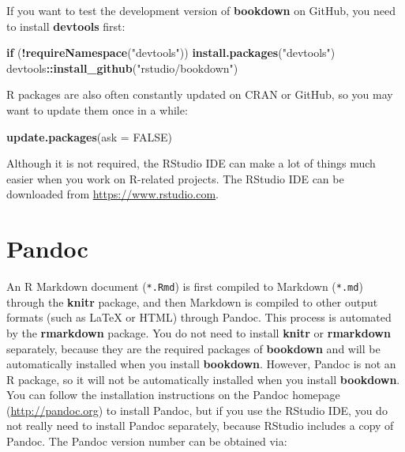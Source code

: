 \documentclass[
  12pt,
]{book}
\newenvironment{Shaded}{\begin{snugshade}}{\end{snugshade}}
\newcommand{\ControlFlowTok}[1]{\textcolor[rgb]{0.13,0.29,0.53}{\textbf{#1}}}
\newcommand{\DataTypeTok}[1]{\textcolor[rgb]{0.13,0.29,0.53}{#1}}
\newcommand{\KeywordTok}[1]{\textcolor[rgb]{0.13,0.29,0.53}{\textbf{#1}}}
\newcommand{\NormalTok}[1]{#1}
\newcommand{\OperatorTok}[1]{\textcolor[rgb]{0.81,0.36,0.00}{\textbf{#1}}}
\newcommand{\OtherTok}[1]{\textcolor[rgb]{0.56,0.35,0.01}{#1}}
\newcommand{\StringTok}[1]{\textcolor[rgb]{0.31,0.60,0.02}{#1}}
\begin{document}
If you want to test the development version of \textbf{bookdown} on GitHub, you need to install \textbf{devtools} first:

\begin{Shaded}
\begin{Highlighting}[]
\ControlFlowTok{if}\NormalTok{ (}\OperatorTok{!}\KeywordTok{requireNamespace}\NormalTok{(}\StringTok{"devtools"}\NormalTok{)) }\KeywordTok{install.packages}\NormalTok{(}\StringTok{"devtools"}\NormalTok{)}
\NormalTok{devtools}\OperatorTok{::}\KeywordTok{install\_github}\NormalTok{(}\StringTok{"rstudio/bookdown"}\NormalTok{)}
\end{Highlighting}
\end{Shaded}

R packages are also often constantly updated on CRAN or GitHub, so you may want to update them once in a while:

\begin{Shaded}
\begin{Highlighting}[]
\KeywordTok{update.packages}\NormalTok{(}\DataTypeTok{ask =} \OtherTok{FALSE}\NormalTok{)}
\end{Highlighting}
\end{Shaded}

Although it is not required, the RStudio IDE can make a lot of things much easier when you work on R-related projects. The RStudio IDE can be downloaded from \url{https://www.rstudio.com}.

\hypertarget{pandoc}{%
\section{Pandoc}\label{pandoc}}

An R Markdown document (\texttt{*.Rmd}) is first compiled to Markdown (\texttt{*.md}) through the \textbf{knitr} package, and then Markdown is compiled to other output formats (such as LaTeX or HTML) through Pandoc. This process is automated by the \textbf{rmarkdown} package. You do not need to install \textbf{knitr} or \textbf{rmarkdown} separately, because they are the required packages of \textbf{bookdown} and will be automatically installed when you install \textbf{bookdown}. However, Pandoc is not an R package, so it will not be automatically installed when you install \textbf{bookdown}. You can follow the installation instructions on the Pandoc homepage (\url{http://pandoc.org}) to install Pandoc, but if you use the RStudio IDE, you do not really need to install Pandoc separately, because RStudio includes a copy of Pandoc. The Pandoc version number can be obtained via:
\end{document}
